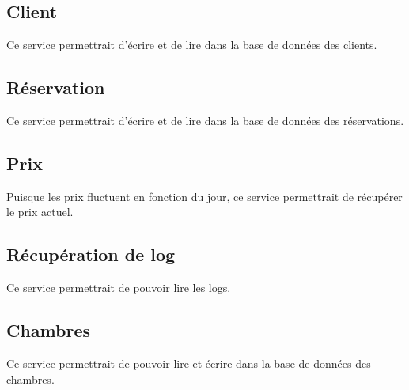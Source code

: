 \documentclass{article}
\begin{document}
\subsection{Client}
Ce service permettrait d'\'{e}crire et de lire dans la base de donn\'ees des clients.

\subsection{R\'eservation}
Ce service permettrait d'\'{e}crire et de lire dans la base de donn\'ees des r\'eservations.


\subsection{Prix}
Puisque les prix fluctuent en fonction du jour, ce service permettrait de r\'ecup\'erer le prix actuel.


\subsection{R\'ecup\'eration de log}
Ce service permettrait de pouvoir lire les logs.

\subsection{Chambres}
Ce service permettrait de pouvoir lire et \'ecrire dans la base de donn\'ees des chambres.

\pagebreak
\end{document}
